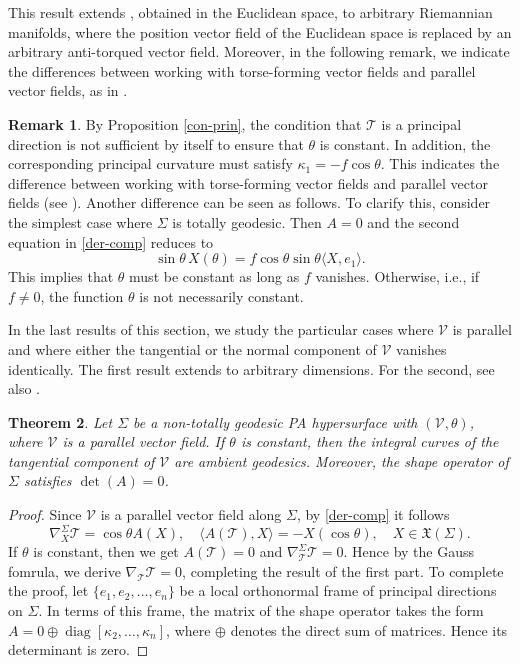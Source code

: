 \documentclass[12pt,reqno]{amsart}
\def\v{\mathcal V}
\def\t{\mathcal T}
\def\x{\mathfrak X}
\newtheorem{theorem}{Theorem}[section]
\theoremstyle{definition}
\newtheorem{remark}[theorem]{Remark}
\begin{document}
This result extends \cite[Proposition 2.1]{mun11}, obtained in the Euclidean space, to arbitrary Riemannian manifolds, where the position vector field of the Euclidean space is replaced by an arbitrary anti-torqued vector field. Moreover, in the following remark, we indicate the differences between working with torse-forming vector fields and parallel vector fields, as in \cite{dgd}.

\begin{remark}\label{rem31}
By Proposition \ref{con-prin}, the condition that $\t$ is a principal direction is not sufficient by itself to ensure that $\theta$ is constant. In addition, the corresponding principal curvature must satisfy $\kappa_1=-f\cos\theta$. This indicates the difference between working with torse-forming vector fields and parallel vector fields (see \cite[Proposition 5]{dgd}).  Another difference can be seen as follows. To clarify this, consider the simplest case where $\Sigma$ is totally geodesic. Then $A=0$ and the second equation in \eqref{der-comp} reduces to
$$
\sin\theta\, X(\theta)= f \cos\theta \sin\theta \langle X,e_1\rangle.
$$
This implies that $\theta$ must be constant as long as $f$ vanishes. Otherwise, i.e., if $f\neq 0$, the function $\theta$ is not necessarily constant.
\end{remark}


In the last results of this section, we study the particular cases where $\v$ is parallel and where either the tangential or the normal component of $\v$ vanishes identically. The first result extends \cite[Proposition 5]{dgd} to arbitrary dimensions. For the second, see also \cite[Proposition 4.1, Corollary 4.2]{amc1}.

\begin{theorem}\label{paral}
Let $\Sigma$ be a non-totally geodesic PA hypersurface with $(\v,\theta)$, where $\v$ is a parallel vector field. 
If $\theta$ is constant, then the integral curves of the tangential component of $\v$ are ambient geodesics. Moreover,  the shape operator of $\Sigma$ satisfies $\operatorname{det}(A)=0$.
\end{theorem}
\begin{proof}
Since $\v$ is a parallel vector field along $\Sigma$, by \eqref{der-comp} it follows
$$
\nabla^\Sigma_X\t=\cos \theta A(X), \quad \langle A(\t),X\rangle=-X(\cos \theta), \quad X\in \x(\Sigma).
$$
If $\theta$ is constant, then we get $A(\t)=0$ and $\nabla^\Sigma_{\t}\t=0$. Hence by the Gauss fomrula, we derive $\nabla_{\t}\t=0$, completing the result of the first part. To complete the proof, let $\{e_1,e_2,\dots,e_n\}$ be a local orthonormal frame of principal directions on $\Sigma$. In terms of this frame, the matrix of the shape operator takes the form $A=0\oplus\operatorname{diag}[\kappa_2,\ldots,\kappa_n]$, where $\oplus$ denotes the direct sum of matrices. Hence its determinant is zero.
\end{proof}
\end{document}
